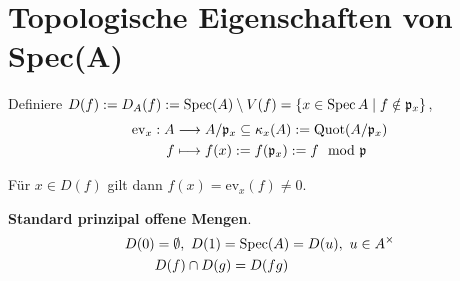 \section{Topologische Eigenschaften von Spec(A)}

Definiere $D(f):=D_{A}(f):=\operatorname{Spec}(A)\setminus V(f)=\{x \in\operatorname{Spec} A \mid f\notin\mathfrak{p}_{x}\}$,
\begin{align*}
  \text{ev}_{x}:A & \longrightarrow A/\mathfrak{p}_{x}\subseteq \kappa_{x}(A) := \operatorname{Quot}(A/\mathfrak{p}_{x})\\
  f & \longmapsto f(x) := f(\mathfrak{p}_{x}) := f \mod \mathfrak{p}
\end{align*}

Für $x \in D(f)$ gilt dann $f(x) = \text{ev}_{x}(f) \neq 0$.

\textbf{Standard prinzipal offene Mengen}.
\begin{align*}
  D(0) & =\emptyset,\ D(1)=\operatorname{Spec}(A)=D(u),\ u\in A^{\times}\\    
  & D(f)\cap D(g) = D(fg)
\end{align*}

